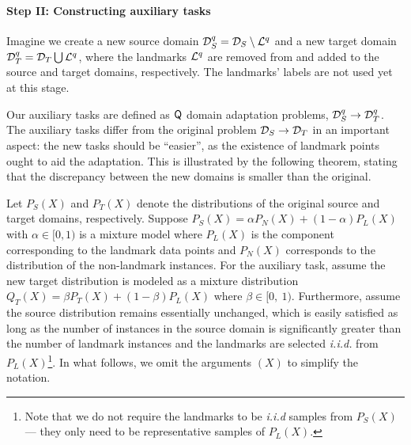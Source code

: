 


\paragraph{\bf Step II: Constructing auxiliary tasks} \label{sAuxiliary}
Imagine we create a new source domain $\mathcal{D}_{S}^q = \mathcal{D}_{S} \setminus \mathcal{L}^q$ and a new target domain $\mathcal{D}_{T}^q = \mathcal{D}_{T}\bigcup \mathcal{L}^q$, where the landmarks $\mathcal{L}^q$ are removed from and added to the source and target domains, respectively. The landmarks' labels are not used yet at this stage.

Our auxiliary tasks are defined as $\mathsf{Q}$  domain adaptation problems, $\mathcal{D}_{S}^q \rightarrow \mathcal{D}_{T}^q$. The auxiliary tasks differ from the original problem $\mathcal{D}_{S} \rightarrow \mathcal{D}_{T}$ in an important aspect:
the new tasks should be ``easier'', as the existence of landmark points ought to aid the adaptation. This is illustrated by the following theorem, stating that the discrepancy between the new domains is smaller than the original.

Let $P_S(X)$ and $P_T(X)$ denote the distributions of the original source and target domains, respectively. Suppose $P_S(X)= \alpha P_N(X) + (1-\alpha)P_L(X)$ with $\alpha \in [0, 1)$ is a mixture model where $P_L(X)$ is the component corresponding to the landmark data points and $P_N(X)$ corresponds to the distribution of the non-landmark instances.  For the auxiliary task, assume the new target distribution is modeled as a mixture distribution $Q_T(X) =  \beta P_T(X) + (1-\beta) P_L(X)$ where $\beta \in [0,\ 1)$. Furthermore, assume the source distribution remains essentially unchanged, which is easily satisfied as long as the number of instances in the source domain is significantly greater than the number of landmark instances and the landmarks are selected \emph{i.i.d.} from $P_L(X)$\footnote{Note that we do not require the landmarks to be \emph{i.i.d} samples from $P_S(X)$ --- they only need to be representative samples of $P_L(X)$.}. In what follows, we omit the arguments $(X)$ to simplify the notation.

